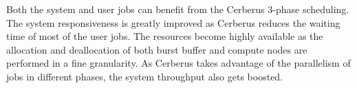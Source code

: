 Both the system and user jobs can benefit from the Cerberus 3-phase scheduling.
The system responsiveness is greatly improved as Cerberus reduces the waiting time of most of the user jobs.
The resources become highly available as the allocation and deallocation of
both burst buffer and compute nodes are performed in a fine granularity.
As Cerberus takes advantage of the parallelism of jobs in different phases, the system throughput also gets boosted.

